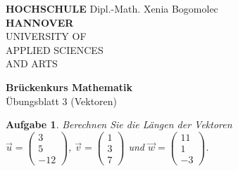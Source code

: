 \documentclass[12pt]{article}
\newtheorem{exercise}[satz]{Aufgabe}
\begin{document}
 \pagestyle{empty}
 \parindent 0cm
 \begin{minipage}{14cm}
 \footnotesize{\textbf{HOCHSCHULE} \hfill Dipl.-Math. Xenia Bogomolec\\
\textbf{HANNOVER}\\
 UNIVERSITY OF\\
 APPLIED SCIENCES\\
 AND ARTS
 }
 \end{minipage}
 \vspace{1.0cm}

\begin{center}
 {\Large \bf Br\"uckenkurs Mathematik} \\
 \vspace{0.5cm}
 {\large \"Ubungsblatt 3 (Vektoren)}  \\

\end{center}
 \vspace{0.5cm}
 \normalsize
 \parindent0cm


\begin{exercise}
  Berechnen Sie die L\"angen der Vektoren \\
  $\vec{u}=\left(\begin{array}{r} 3 \\ 5 \\ -12 \end{array}\right)$,
  $\vec{v}=\left(\begin{array}{r} 1 \\ 3 \\ 7 \end{array}\right)$ und
  $\vec{w}=\left(\begin{array}{r} 11 \\ 1 \\ -3 \end{array}\right)$.
\end{exercise}

\vspace{0.1cm}
   
\end{document}
